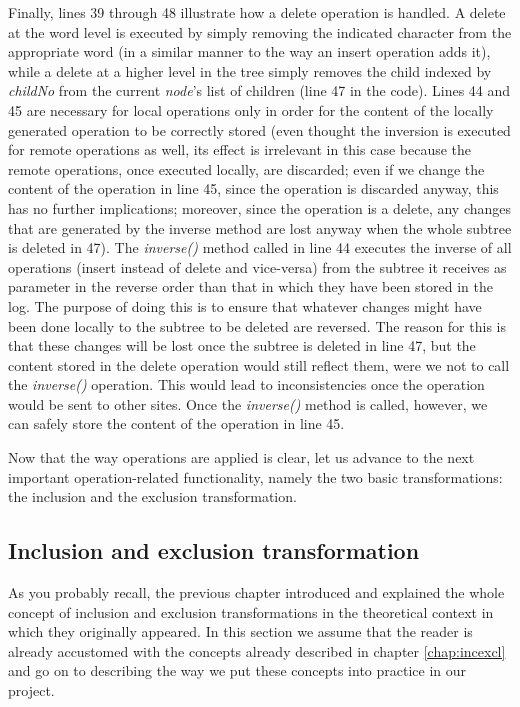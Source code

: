 Finally, lines 39 through 48 illustrate how a delete operation is handled. A delete
at the word level is executed by simply removing the indicated character from the
appropriate word (in a similar manner to the way an insert operation adds it), while
a delete at a higher level in the tree simply removes the child indexed by \emph{childNo}
from the current \emph{node}'s list of children (line 47 in the code). Lines 44 and 45
are necessary for local operations only in order for the content of the locally
generated operation to be correctly stored (even thought the inversion is executed for
remote operations as well, its effect is irrelevant in this case because the remote
operations, once executed locally, are discarded; even if we change the content
of the operation in line 45, since the operation is discarded anyway, this has no
further implications; moreover, since the operation is a delete, any changes that are
generated by the inverse method are lost anyway when the whole subtree is deleted
in 47). The \emph{inverse()} method called in
line 44 executes the inverse of all operations (insert instead of delete and
vice-versa) from the subtree it receives as parameter in the reverse order than
that in which they have been stored in the log. The purpose of doing this is to
ensure that whatever changes might have been done locally to the subtree to be
deleted are reversed. The reason for this is that these changes will be lost once
the subtree is deleted in line 47, but the content stored in the delete operation
would still reflect them, were we not to call the \emph{inverse()} operation. This
would lead to inconsistencies once the operation would be sent to other sites.
Once the \emph{inverse()} method is called, however, we can safely store the
content of the operation in line 45.

Now that the way operations are applied is clear, let us advance to the next important
operation-related functionality, namely the two basic transformations: the inclusion
and the exclusion transformation.

\subsection{Inclusion and exclusion transformation}

As you probably recall, the previous chapter introduced and explained the whole
concept of inclusion and exclusion transformations in the theoretical context
in which they originally appeared. In this section we assume that the reader is
already accustomed with the concepts already described in chapter \ref{chap:incexcl}
and go on to describing the way we put these concepts into practice in our project.

